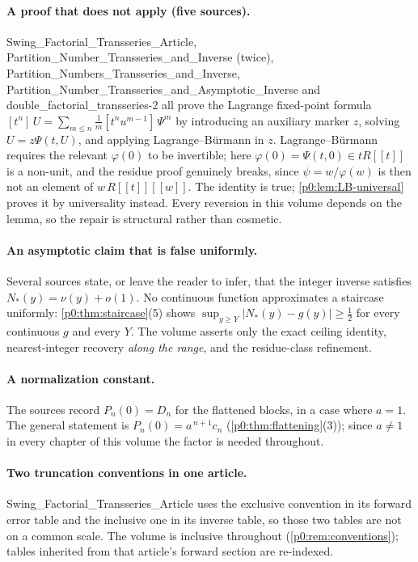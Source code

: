 \documentclass[11pt,a4paper,oneside]{book}
\theoremstyle{plain}
\theoremstyle{definition}
\theoremstyle{remark}
\newcommand{\Coef}[1]{[#1]\,}
\newcommand{\littleo}{o}
\begin{document}
\paragraph{A proof that does not apply (five sources).}
\textsf{Swing\_\allowbreak Factorial\_\allowbreak Transseries\_\allowbreak Article},
\textsf{Partition\_\allowbreak Number\_\allowbreak Transseries\_\allowbreak and\_\allowbreak Inverse} (twice),
\textsf{Partition\_\allowbreak Numbers\_\allowbreak Transseries\_\allowbreak and\_\allowbreak Inverse},
\textsf{Partition\_\allowbreak Number\_\allowbreak Transseries\_\allowbreak and\_\allowbreak Asymptotic\_\allowbreak Inverse} and
\textsf{double\_\allowbreak factorial\_\allowbreak transseries-2} all prove the Lagrange fixed-point
formula
\(\Coef{t^n}U=\sum_{m\le n}\tfrac1m\Coef{t^nu^{m-1}}\Psi^m\)
by introducing an auxiliary marker \(z\), solving \(U=z\Psi(t,U)\), and
applying Lagrange--Bürmann in \(z\).  Lagrange--Bürmann requires the relevant
\(\varphi(0)\) to be invertible; here \(\varphi(0)=\Psi(t,0)\in tR[[t]]\) is a
non-unit, and the residue proof genuinely breaks, since \(\psi=w/\varphi(w)\)
is then not an element of \(w\,R[[t]][[w]]\).  The identity is true;
\cref{p0:lem:LB-universal} proves it by universality instead.  Every reversion
in this volume depends on the lemma, so the repair is structural rather than
cosmetic.

\paragraph{An asymptotic claim that is false uniformly.}
Several sources state, or leave the reader to infer, that the integer inverse
satisfies \(N_\ast(y)=\nu(y)+\littleo(1)\).  No continuous function
approximates a staircase uniformly: \cref{p0:thm:staircase}(5) shows
\(\sup_{y\ge Y}\lvert N_\ast(y)-g(y)\rvert\ge\tfrac12\) for every continuous
\(g\) and every \(Y\).  The volume asserts only the exact ceiling identity,
nearest-integer recovery \emph{along the range}, and the residue-class
refinement.

\paragraph{A normalization constant.}
The sources record \(P_n(0)=D_n\) for the flattened blocks, in a case where
\(a=1\).  The general statement is \(P_n(0)=a^{\,n+1}c_n\)
(\cref{p0:thm:flattening}(3)); since \(a\neq1\) in every chapter of this
volume the factor is needed throughout.

\paragraph{Two truncation conventions in one article.}
\textsf{Swing\_\allowbreak Factorial\_\allowbreak Transseries\_\allowbreak Article} uses the exclusive convention
in its forward error table and the inclusive one in its inverse table, so
those two tables are not on a common scale.  The volume is inclusive
throughout (\cref{p0:rem:conventions}); tables inherited from that article's
forward section are re-indexed.
\end{document}
